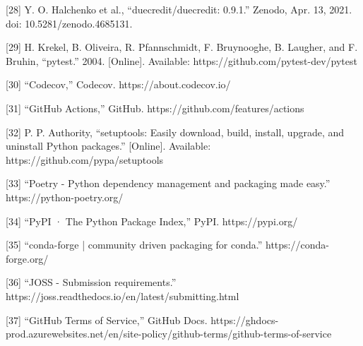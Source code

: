 \documentclass{article}
\begin{document}
[28]    Y. O. Halchenko et al., “duecredit/duecredit: 0.9.1.” Zenodo, Apr. 13, 2021. doi: 10.5281/zenodo.4685131.

[29]    H. Krekel, B. Oliveira, R. Pfannschmidt, F. Bruynooghe, B. Laugher, and F. Bruhin, “pytest.” 2004. [Online]. Available: https://github.com/pytest-dev/pytest

[30]    “Codecov,” Codecov. https://about.codecov.io/

[31]    “GitHub Actions,” GitHub. https://github.com/features/actions

[32]    P. P. Authority, “setuptools: Easily download, build, install, upgrade, and uninstall Python packages.” [Online]. Available: https://github.com/pypa/setuptools

[33]    “Poetry - Python dependency management and packaging made easy.” https://python-poetry.org/

[34]    “PyPI · The Python Package Index,” PyPI. https://pypi.org/

[35]    “conda-forge | community driven packaging for conda.” https://conda-forge.org/

[36]    “JOSS - Submission requirements.” https://joss.readthedocs.io/en/latest/submitting.html

[37]    “GitHub Terms of Service,” GitHub Docs. https://ghdocs-prod.azurewebsites.net/en/site-policy/github-terms/github-terms-of-service
\end{document}
